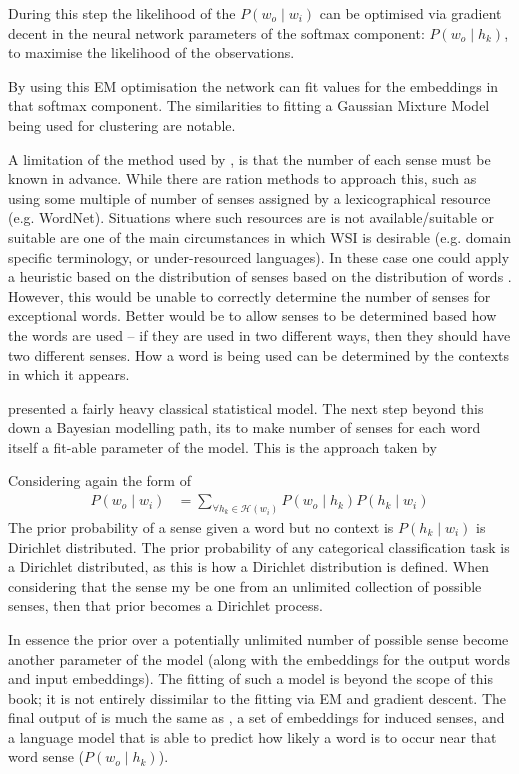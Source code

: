 \documentclass[12pt,parskip]{komatufte}
\begin{document}
During this step the likelihood of the $P(w_o \mid w_i)$ can be optimised via gradient decent in the neural network parameters of the softmax component: $P(w_o \mid h_k)$,
to maximise the likelihood of the observations.

By using this EM optimisation the network can fit values for the embeddings in that softmax component.
The similarities to fitting a Gaussian Mixture Model being used for clustering are notable.


A limitation of the method used by , is that the number of each sense must be known in advance.
While there are ration methods to approach this,
such as using some multiple of number of senses assigned by a lexicographical resource (e.g. WordNet).
Situations where such resources are  is not available/suitable or suitable are one of the main circumstances in which WSI is desirable  (e.g. domain specific terminology, or under-resourced languages).
In these case one could apply a heuristic based on the distribution of senses based on the distribution of words \parencite{zipf1945meaning}.
However, this would be unable to correctly determine the number of senses for exceptional words.
Better would be to allow senses to be determined based how the words are used -- if they are used in two different ways, then they should have two different senses.
How a word is being used can be determined by the contexts in which it appears.


 presented a fairly heavy classical statistical model.
The next step beyond this down a Bayesian modelling path,
its to make number of senses for each word itself a fit-able parameter of the model.
This is the approach taken by 

Considering again the form of 
\begin{align}
P(w_o\mid w_i) &= \sum_{\forall h_k \in \mathcal{H}(w_i)} P(w_o \mid h_k) P(h_k \mid w_i) 
\end{align}
The prior probability of a sense given a word but no context is 
$P(h_k \mid w_i)$ is Dirichlet distributed.
The prior probability of any categorical classification task is a Dirichlet distributed, as this is how a Dirichlet distribution is defined.
When considering that the sense my be one from an unlimited collection of possible senses,
then that prior becomes a Dirichlet process.

In essence the prior over a potentially unlimited number of possible sense become another parameter of the model (along with the embeddings for the output words and input embeddings).
The fitting of such a model is beyond the scope of this book;
it is not entirely dissimilar to the fitting via EM and gradient descent.
The final output of  is much the same as ,
a set of embeddings for induced senses,
and a language model that is able to predict how likely a word is to occur near that word sense ($P(w_o \mid h_k)$).
\end{document}
